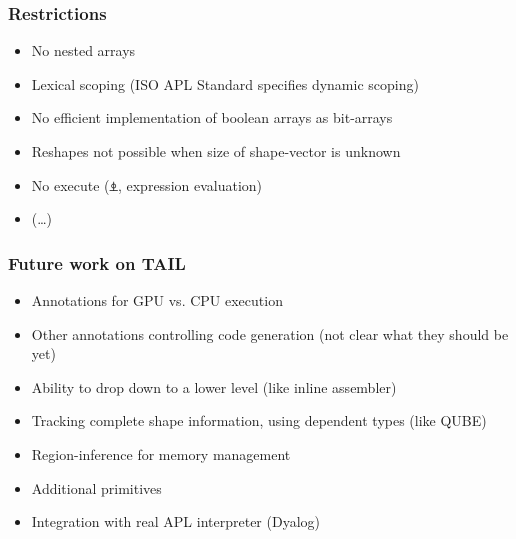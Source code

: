 \documentclass{beamer}
\begin{document}


\begin{frame}
\frametitle{Restrictions}
\begin{itemize}
\item No nested arrays
\item Lexical scoping (ISO APL Standard specifies dynamic scoping)
\item No efficient implementation of boolean arrays as bit-arrays
\item Reshapes not possible when size of shape-vector is unknown
\item No execute (⍎, expression evaluation)
\item (\ldots)
\end{itemize}
\end{frame}


\begin{frame}
  \frametitle{Future work on TAIL}
  \begin{itemize}
  \item Annotations for GPU vs. CPU execution
  \item Other annotations controlling code generation (not clear what
    they should be yet)
  \item Ability to drop down to a lower level (like inline assembler)
  \item Tracking complete shape information, using dependent types
    (like QUBE)
  \item Region-inference for memory management
  \item Additional primitives
  \item Integration with real APL interpreter (Dyalog)
  \end{itemize}
\end{frame}
\end{document}
